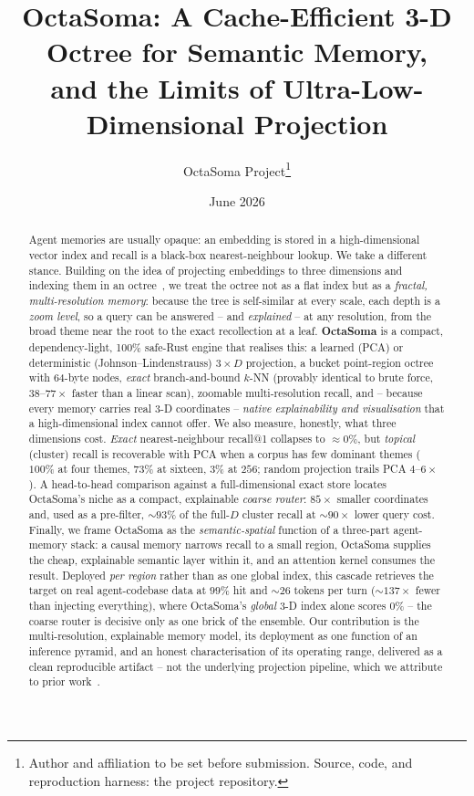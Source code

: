 \documentclass[11pt]{article}
\title{\textbf{OctaSoma}: A Cache-Efficient 3-D Octree for Semantic Memory,\\
and the Limits of Ultra-Low-Dimensional Projection}
\author{OctaSoma Project\thanks{Author and affiliation to be set before
submission. Source, code, and reproduction harness: the project repository.}}
\date{June 2026}
\begin{document}
\maketitle

\begin{abstract}
Agent memories are usually opaque: an embedding is stored in a high-dimensional
vector index and recall is a black-box nearest-neighbour lookup. We take a
different stance. Building on the idea of projecting embeddings to three
dimensions and indexing them in an octree~\cite{octreerag}, we treat the octree
not as a flat index but as a \emph{fractal, multi-resolution memory}: because the
tree is self-similar at every scale, each depth is a \emph{zoom level}, so a query
can be answered -- and \emph{explained} -- at any resolution, from the broad theme
near the root to the exact recollection at a leaf. \textbf{OctaSoma} is a compact,
dependency-light, 100\% safe-Rust engine that realises this: a learned (PCA) or
deterministic (Johnson--Lindenstrauss) $3\times D$ projection, a bucket
point-region octree with 64-byte nodes, \emph{exact} branch-and-bound $k$-NN
(provably identical to brute force, $38$--$77\times$ faster than a linear scan),
zoomable multi-resolution recall, and -- because every memory carries real 3-D
coordinates -- \emph{native explainability and visualisation} that a
high-dimensional index cannot offer. We also measure, honestly, what three
dimensions cost. \emph{Exact} nearest-neighbour recall@1 collapses to
${\approx}0\%$, but \emph{topical} (cluster) recall is recoverable with PCA when a
corpus has few dominant themes ($100\%$ at four themes, $73\%$ at sixteen, $3\%$ at
$256$; random projection trails PCA $4$--$6\times$). A head-to-head comparison
against a full-dimensional exact store locates OctaSoma's niche as a compact,
explainable \emph{coarse router}: $85\times$ smaller coordinates and, used as a
pre-filter, ${\sim}93\%$ of the full-$D$ cluster recall at ${\sim}90\times$ lower
query cost. Finally, we frame OctaSoma as the \emph{semantic-spatial} function of a
three-part agent-memory stack: a causal memory narrows recall to a small region,
OctaSoma supplies the cheap, explainable semantic layer within it, and an attention
kernel consumes the result. Deployed \emph{per region} rather than as one global
index, this cascade retrieves the target on real agent-codebase data at $99\%$ hit
and ${\sim}26$ tokens per turn (${\sim}137\times$ fewer than injecting everything),
where OctaSoma's \emph{global} 3-D index alone scores $0\%$ -- the coarse router is
decisive only as one brick of the ensemble. Our contribution is the
multi-resolution, explainable memory model, its deployment as one function of an
inference pyramid, and an honest characterisation of its operating range, delivered
as a clean reproducible artifact -- not the underlying projection pipeline, which we
attribute to prior work~\cite{octreerag}.
\end{abstract}
\end{document}
